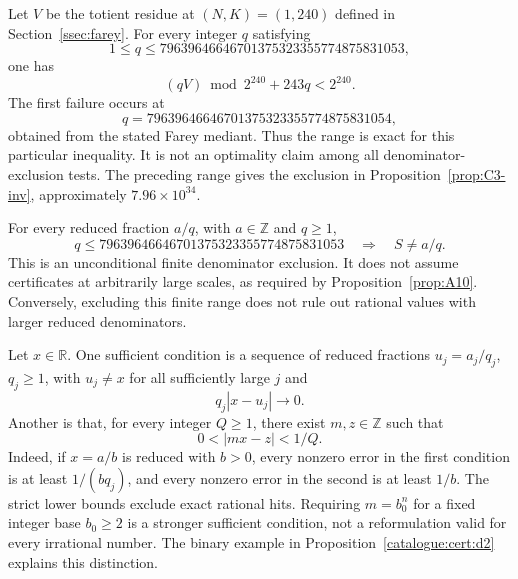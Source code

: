 \begin{prop}\label{prop:C2-inv}
Let $V$ be the totient residue at $(N,K)=(1,240)$ defined in
Section~\ref{ssec:farey}. For every integer $q$ satisfying
\[
 1\le q\le79639646646701375323355774875831053,
\]
one has
\[
 (qV)\bmod2^{240}+243q<2^{240}.
\]
The first failure occurs at
\[
 q=79639646646701375323355774875831054,
\]
obtained from the stated Farey mediant. Thus the range is exact for
this particular inequality.
It is not an optimality claim among all denominator-exclusion tests.
The preceding range gives the exclusion in
Proposition~\ref{prop:C3-inv}, approximately $7.96\times10^{34}$.
\end{prop}

\begin{prop}\label{prop:C3-inv}
For every reduced fraction $a/q$, with $a\in\mathbb Z$ and $q\ge1$,
\[
 q\le79639646646701375323355774875831053
 \quad\Longrightarrow\quad S\ne a/q.
\]
This is an unconditional finite denominator exclusion. It does not
assume certificates at arbitrarily large scales, as required by
Proposition~\ref{prop:A10}. Conversely, excluding this finite range
does not rule out rational values with larger reduced denominators.
\end{prop}

\begin{prop}\label{prop:D1D2-inv}
Let $x\in\mathbb R$. One sufficient condition is a sequence of
reduced fractions $u_j=a_j/q_j$, $q_j\ge1$, with $u_j\ne x$ for
all sufficiently large $j$ and
\[
 q_j|x-u_j|\longrightarrow0.
\]
Another is that, for every integer $Q\ge1$, there exist $m,z\in\mathbb Z$
such that
\[
 0<|mx-z|<1/Q.
\]
Indeed, if $x=a/b$ is reduced with $b>0$, every nonzero error in the
first condition is at least $1/(bq_j)$, and every nonzero error in the
second is at least $1/b$. The strict lower bounds exclude exact
rational hits. Requiring $m=b_0^n$ for a fixed integer base $b_0\ge2$
is a stronger sufficient condition, not a reformulation valid for
every irrational number. The binary example in
Proposition~\ref{catalogue:cert:d2} explains this distinction.
\end{prop}

